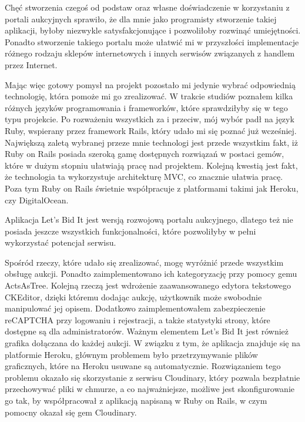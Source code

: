 \documentclass[brudnopis]{xmgr}
\begin{document}

\maketitle

\introduction

Chęć stworzenia czegoś od podstaw oraz własne doświadczenie w korzystaniu z portali aukcyjnych sprawiło, że dla mnie jako programisty stworzenie takiej aplikacji, byłoby niezwykle satysfakcjonujące i pozwoliłoby rozwinąć umiejętności. Ponadto stworzenie takiego portalu może ułatwić mi w przyszłości implementacje różnego rodzaju sklepów internetowych i innych serwisów związanych z handlem przez Internet.

Mając więc gotowy pomysł na projekt pozostało mi jedynie wybrać odpowiednią technologię, która pomoże mi go zrealizować. W trakcie studiów poznałem kilka różnych języków programowania i frameworków, które sprawdziłyby się w tego typu projekcie. Po rozważeniu wszystkich za i przeciw, mój wybór padł na język Ruby, wspierany przez framework Rails, który udało mi się poznać już wcześniej. Największą zaletą wybranej przeze mnie technologi jest przede wszystkim fakt, iż Ruby on Rails posiada szeroką gamę dostępnych rozwiązań w postaci gemów, które w dużym stopniu ułatwiają pracę nad projektem. Kolejną kwestią jest fakt, że technologia  ta wykorzystuje architekturę MVC, co znacznie ułatwia pracę. Poza tym Ruby on Rails świetnie współpracuje z platformami takimi jak Heroku, czy DigitalOcean.

Aplikacja Let's Bid It jest wersją rozwojową portalu aukcyjnego, dlatego też nie posiada jeszcze wszystkich funkcjonalności, które pozwoliłyby w pełni wykorzystać potencjał serwisu.

Spośród rzeczy, które udało się zrealizować, mogę wyróżnić przede wszystkim obsługę aukcji. Ponadto zaimplementowano ich kategoryzację przy pomocy gemu ActsAsTree. Kolejną rzeczą jest wdrożenie zaawansowanego edytora tekstowego CKEditor, dzięki któremu dodając aukcję, użytkownik może swobodnie manipulować jej opisem. Dodatkowo zaimplementowałem zabezpieczenie reCAPTCHA przy logowaniu i rejestracji, a także statystyki strony, które dostępne są dla administratorów. Ważnym elementem Let's Bid It jest również grafika dołączana do każdej aukcji. W związku z tym, że aplikacja znajduje się na platformie Heroku, głównym problemem było przetrzymywanie plików graficznych, które na Heroku usuwane są automatycznie. Rozwiązaniem tego problemu okazało się skorzystanie z serwisu Cloudinary, który pozwala bezpłatnie przechowywać pliki w chmurze, a co najważniejsze, możliwe jest skonfigurowanie go tak, by współpracował z aplikacją napisaną w Ruby on Rails, w czym pomocny okazał się gem Cloudinary.
\end{document}
